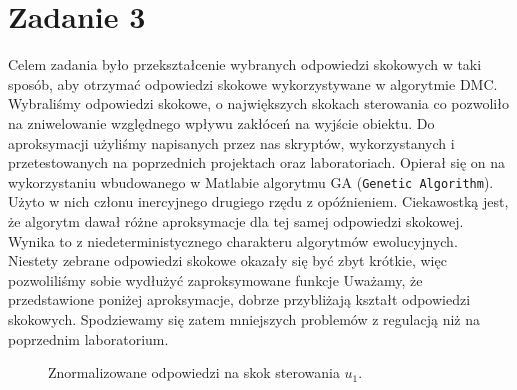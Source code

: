 \chapter{Zadanie 3}
Celem zadania było przekształcenie wybranych odpowiedzi skokowych w taki sposób, aby otrzymać odpowiedzi skokowe wykorzystywane w algorytmie DMC. Wybraliśmy odpowiedzi skokowe, o największych skokach sterowania
co pozwoliło na zniwelowanie względnego wpływu zakłóceń na wyjście obiektu. Do aproksymacji użyliśmy napisanych przez nas skryptów, wykorzystanych i przetestowanych na poprzednich projektach oraz
laboratoriach. Opierał się on na wykorzystaniu wbudowanego w Matlabie algorytmu GA (\texttt{Genetic Algorithm}). Użyto w nich członu inercyjnego drugiego rzędu z opóźnieniem.
Ciekawostką jest, że algorytm dawał różne aproksymacje dla tej samej odpowiedzi skokowej. Wynika to z niedeterministycznego charakteru algorytmów ewolucyjnych.
Niestety zebrane odpowiedzi skokowe okazały się być zbyt krótkie, więc pozwoliliśmy sobie wydłużyć zaproksymowane
funkcje
Uważamy, że przedstawione poniżej aproksymacje, dobrze przybliżają kształt odpowiedzi skokowych. Spodziewamy się
zatem mniejszych problemów z regulacją niż na poprzednim laboratorium.

\begin{figure}[tb]
\centering
{}
\caption{Znormalizowane odpowiedzi na skok sterowania $u_1$.}
\label{fig:dmc1}
\end{figure}

